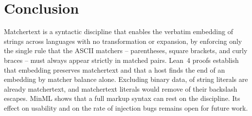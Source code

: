 \section{Conclusion}
\label{sec:concl}

Matchertext is a syntactic discipline
that enables the verbatim embedding of strings across languages
with no transformation or expansion,
by enforcing only the single rule that the ASCII matchers --
parentheses, square brackets, and curly braces --
must always appear strictly in matched pairs.
Lean~4 proofs establish that embedding preserves matchertext
and that a host finds the end of an embedding by matcher balance alone.
Excluding binary data, \dataStrCompliance of \dataStrSamples string literals are already matchertext,
and matchertext literals would remove \dataReduction of their backslash escapes.
MinML shows that a full markup syntax can rest on the discipline.
Its effect on usability and on the rate of injection bugs
remains open for future work.
